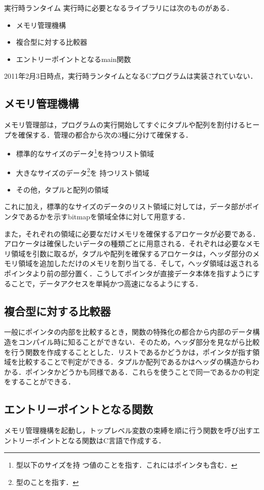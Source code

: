 \documentclass[a4paper,titlepage,report,disablejfam]{jsbook}
\begin{document}
\begin{resbonsiblesection}{実行時ランタイム}{\kobori}\label{sc:impl-runtime}
 実行時に必要となるライブラリには次のものがある．
\begin{itemize}
 \item メモリ管理機構
 \item 複合型に対する比較器
 \item エントリーポイントとなるmain関数
\end{itemize}
 
 2011年2月3日時点，実行時ランタイムとなるCプログラムは実装されていない．

\subsection{メモリ管理機構}
メモリ管理部は，プログラムの実行開始してすぐにタプルや配列を割付けるヒー
プを確保する．管理の都合から次の3種に分けて確保する．
\begin{itemize}
 \item 標準的なサイズのデータ\footnote{型以下のサイズを持
       つ値のことを指す．これにはポインタも含む．}を持つリスト領域
 \item 大きなサイズのデータ\footnote{型のことを指す．}を
       持つリスト領域
 \item その他，タプルと配列の領域
\end{itemize}

これに加え，標準的なサイズのデータのリスト領域に対しては，データ部がポイ
ンタであるかを示すbitmapを領域全体に対して用意する．

また，それぞれの領域に必要なだけメモリを確保するアロケータが必要である．
アロケータは確保したいデータの種類ごとに用意される．それぞれは必要なメモ
リ領域を引数に取るが，タプルや配列を確保するアロケータは，ヘッダ部分のメ
モリ領域を追加しただけのメモリを割り当てる．そして，ヘッダ領域は返される
ポインタより前の部分置く．こうしてポインタが直接データ本体を指すようにす
ることで，データアクセスを単純かつ高速になるようにする．

\subsection{複合型に対する比較器}
一般にポインタの内部を比較するとき，関数の特殊化の都合から内部のデータ構
造をコンパイル時に知ることができない．そのため，ヘッダ部分を見ながら比較
を行う関数を作成することとした．リストであるかどうかは，ポインタが指す領
域を比較することで判定ができる．タプルか配列であるかはヘッダの構造からわ
かる．ポインタかどうかも同様である．これらを使うことで同一であるかの判定
をすることができる．

\subsection{エントリーポイントとなる関数}
メモリ管理機構を起動し，トップレベル変数の束縛を順に行う関数を呼び出すエ
ントリーポイントとなる関数はC言語で作成する．
\end{resbonsiblesection}
\end{document}

